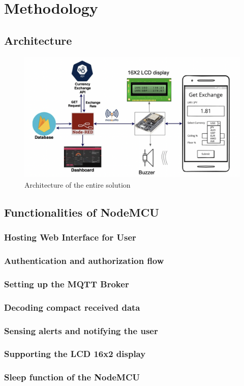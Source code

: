 \section{Methodology}

\subsection{Architecture}

\begin{figure}[h]
    \centering
      \includegraphics[width=1\textwidth]{images/arch.png}
    \caption{Architecture of the entire solution}
    \label{fig:arch}
\end{figure}

\subsection{Functionalities of NodeMCU}

\subsubsection{Hosting Web Interface for User}
\subsubsection{Authentication and authorization flow}
\subsubsection{Setting up the MQTT Broker}
\subsubsection{Decoding compact received data}
\subsubsection{Sensing alerts and notifying the user}
\subsubsection{Supporting the LCD 16x2 display}
\subsubsection{Sleep function of the NodeMCU}